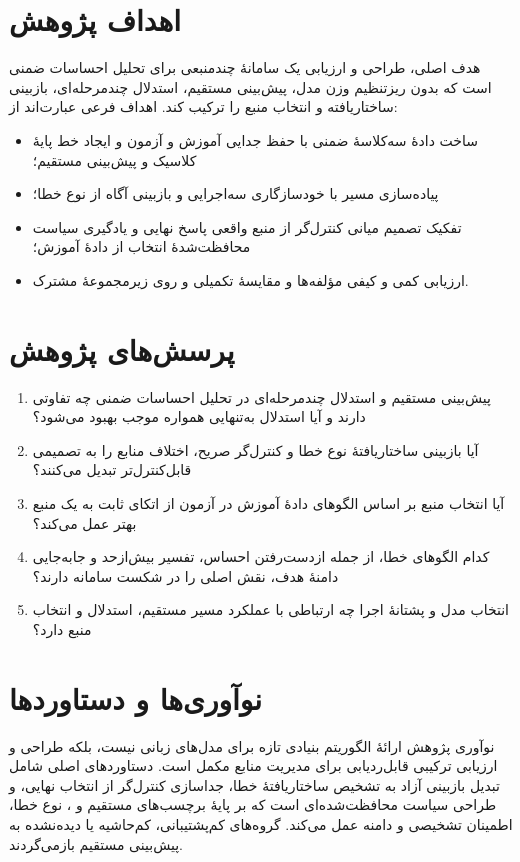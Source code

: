 \section{اهداف پژوهش}

هدف اصلی، طراحی و ارزیابی یک سامانۀ چندمنبعی برای تحلیل احساسات ضمنی است که بدون ریزتنظیم وزن مدل، پیش‌بینی مستقیم، استدلال چندمرحله‌ای، بازبینی ساختاریافته و انتخاب منبع را ترکیب کند. اهداف فرعی عبارت‌اند از:

\begin{itemize}
    \item ساخت دادۀ سه‌کلاسۀ ضمنی با حفظ جدایی آموزش و آزمون و ایجاد خط پایۀ کلاسیک و پیش‌بینی مستقیم؛
    \item پیاده‌سازی مسیر  با خودسازگاری سه‌اجرایی و بازبینی آگاه از نوع خطا؛
    \item تفکیک تصمیم میانی کنترل‌گر از منبع واقعی پاسخ نهایی و یادگیری سیاست محافظت‌شدۀ انتخاب از دادۀ آموزش؛
    \item ارزیابی کمی و کیفی مؤلفه‌ها و مقایسۀ تکمیلی  و  روی زیرمجموعۀ مشترک.
\end{itemize}

\section{پرسش‌های پژوهش}

\begin{enumerate}
    \item پیش‌بینی مستقیم و استدلال چندمرحله‌ای در تحلیل احساسات ضمنی چه تفاوتی دارند و آیا استدلال به‌تنهایی همواره موجب بهبود می‌شود؟
    \item آیا بازبینی ساختاریافتۀ نوع خطا و کنترل‌گر صریح، اختلاف منابع را به تصمیمی قابل‌کنترل‌تر تبدیل می‌کنند؟
    \item آیا انتخاب منبع بر اساس الگوهای دادۀ آموزش در آزمون از اتکای ثابت به یک منبع بهتر عمل می‌کند؟
    \item کدام الگوهای خطا، از جمله ازدست‌رفتن احساس، تفسیر بیش‌ازحد و جابه‌جایی دامنۀ هدف، نقش اصلی را در شکست سامانه دارند؟
    \item انتخاب مدل و پشتانۀ اجرا چه ارتباطی با عملکرد مسیر مستقیم، استدلال و انتخاب منبع دارد؟
\end{enumerate}

\section{نوآوری‌ها و دستاوردها}

نوآوری پژوهش ارائۀ الگوریتم بنیادی تازه برای مدل‌های زبانی نیست، بلکه طراحی و ارزیابی ترکیبی قابل‌ردیابی برای مدیریت منابع مکمل است. دستاوردهای اصلی شامل تبدیل بازبینی آزاد به تشخیص ساختاریافتۀ خطا، جداسازی کنترل‌گر از انتخاب نهایی، و طراحی سیاست محافظت‌شده‌ای است که بر پایۀ برچسب‌های مستقیم و ، نوع خطا، اطمینان تشخیصی و دامنه عمل می‌کند. گروه‌های کم‌پشتیبانی، کم‌حاشیه یا دیده‌نشده به پیش‌بینی مستقیم بازمی‌گردند.

